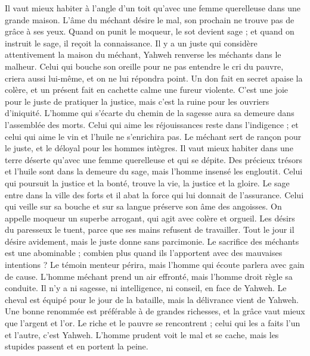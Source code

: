 \begin{multicols}{2}
Il vaut mieux habiter à l’angle d'un toit qu’avec une femme querelleuse dans une grande maison.
L'âme du méchant désire le mal, son prochain ne trouve pas de grâce à ses yeux.
Quand on punit le moqueur, le sot devient sage ; et quand on instruit le sage, il reçoit la connaissance.
Il y a un juste qui considère attentivement la maison du méchant, Yahweh renverse les méchants dans le malheur.
Celui qui bouche son oreille pour ne pas entendre le cri du pauvre, criera aussi lui-même, et on ne lui répondra point.
Un don fait en secret apaise la colère, et un présent fait en cachette calme une fureur violente.
C'est une joie pour le juste de pratiquer la justice, mais c'est la ruine pour les ouvriers d'iniquité.
L'homme qui s’écarte du chemin de la sagesse aura sa demeure dans l'assemblée des morts.
Celui qui aime les réjouissances reste dans l’indigence ; et celui qui aime le vin et l’huile ne s'enrichira pas.
Le méchant sert de rançon pour le juste, et le déloyal pour les hommes intègres.
Il vaut mieux habiter dans une terre déserte qu'avec une femme querelleuse et qui se dépite.
Des précieux trésors et l'huile sont dans la demeure du sage, mais l'homme insensé les engloutit.
Celui qui poursuit la justice et la bonté, trouve la vie, la justice et la gloire.
Le sage entre dans la ville des forts et il abat la force qui lui donnait de l’assurance.
Celui qui veille sur sa bouche et sur sa langue préserve son âme des angoisses.
On appelle moqueur un superbe arrogant, qui agit avec colère et orgueil.
Les désirs du paresseux le tuent, parce que ses mains refusent de travailler.
Tout le jour il désire avidement, mais le juste donne sans parcimonie.
Le sacrifice des méchants est une abominable ; combien plus quand ils l'apportent avec des mauvaises intentions ?
Le témoin menteur périra, mais l'homme qui écoute parlera avec gain de cause.
L'homme méchant prend un air effronté, mais l'homme droit règle sa conduite.
Il n'y a ni sagesse, ni intelligence, ni conseil, en face de Yahweh.
Le cheval est équipé pour le jour de la bataille, mais la délivrance vient de Yahweh.
\VerseOne{}Une bonne renommée est préférable à de grandes richesses, et la grâce vaut mieux que l'argent et l'or.
Le riche et le pauvre se rencontrent ; celui qui les a faits l’un et l’autre, c'est Yahweh.
L'homme prudent voit le mal et se cache, mais les stupides passent et en portent la peine.

\end{multicols}
